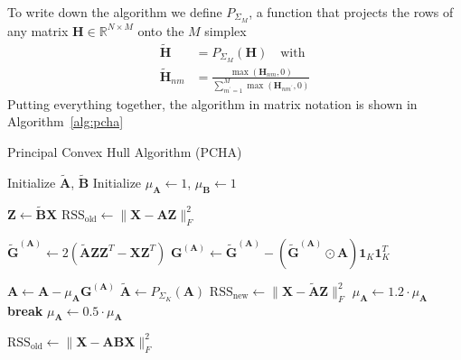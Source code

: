 \documentclass[oneside]{article}
\begin{document}
To write down the algorithm we define $P_{\Sigma_M}$, a function that projects the rows of any matrix $\mathbf{H} \in \mathbb{R}^{N \times M}$ onto the $M$ simplex
\begin{equation}
\begin{aligned}
\tilde{\mathbf{H}} &= P_{\Sigma_M} \left(\mathbf{H} \right) \quad \text{with}\\
\tilde{\mathbf{H}}_{nm} &= \frac{\max(\mathbf{H}_{nm},0)}{\sum_{m^\prime=1}^M \max(\mathbf{H}_{nm^\prime},0)}
\end{aligned}
\end{equation}
Putting everything together, the algorithm in matrix notation is shown in Algorithm~\ref{alg:pcha}

\begin{algorithm}
\caption{Principal Convex Hull Algorithm (PCHA)}
\label{alg:pcha}
\begin{algorithmic}[1]
\State Initialize $\tilde{\mathbf{A}}$, $\tilde{\mathbf{B}}$
\State Initialize $\mu_\mathbf{A} \gets 1$, $\mu_\mathbf{B} \gets 1$
  
    \State {}
    \State $\mathbf{Z} \gets \tilde{\mathbf{B}} \mathbf{X}$
    \State $\text{RSS}_{\text{old}} \gets \| \mathbf{X} - \mathbf{A} \mathbf{Z} \|_F^2$

        \State $\tilde{\mathbf{G}}^{(\mathbf{A})} \gets 2 \left( \tilde{\mathbf{A}} \mathbf{Z} \mathbf{Z}^T - \mathbf{X} \mathbf{Z}^T \right)$
        \State $\mathbf{G}^{(\mathbf{A})} \gets \tilde{\mathbf{G}}^{(\mathbf{A})} - \left(\tilde{\mathbf{G}}^{(\mathbf{A})} \odot \mathbf{A}\right) \mathbf{1}_K \mathbf{1}_K^T$
        
         
            \State $\mathbf{A} \gets \mathbf{A} - \mu_\mathbf{A} \mathbf{G}^{(\mathbf{A})}$
            \State $\tilde{\mathbf{A}} \gets P_{\Sigma_K}(\mathbf{A})$
            \State $\text{RSS}_{\text{new}} \gets \| \mathbf{X} - \tilde{\mathbf{A}} \mathbf{Z} \|_F^2$
                \State $\mu_\mathbf{A} \gets 1.2 \cdot \mu_\mathbf{A}$
                \State \textbf{break}
            \Else
                \State $\mu_\mathbf{A} \gets 0.5 \cdot \mu_\mathbf{A}$
            \EndIf
        \EndFor
    \EndFor

    \State {}
    \State $\text{RSS}_{\text{old}} \gets \| \mathbf{X} - \mathbf{A} \mathbf{B} \mathbf{X} \|_F^2$


\end{algorithmic}
\end{algorithm}
\end{document}
